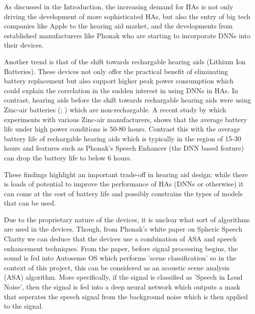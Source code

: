 \documentclass[logo,bsc,singlespacing,parskip,online]{infthesis}
\begin{document}

As discussed in the Introduction, the increasing demand for HAs is not only 
driving the development of more sophisticated HAs, but also the entry of big tech 
companies like Apple to the hearing aid market, and the developments from established 
manufacturers like Phonak who are starting to incorporate DNNs into their devices.

Another trend is that of the shift towards rechargable hearing aids (Lithium Ion Batteries).
These devices not only offer the practical benefit of eliminating battery replacement but also support higher peak power consumption 
which could explain the correlation in the sudden interest in using DNNs in HAs.
In contrast, hearing aids before the shift towards rechargable hearing aids were using Zinc-air batteries 
(\cite{sparkes_study_1997}; \cite{mir_evaluation_2023})
which are non-rechargable.
A recent study by \citet{thomas_zincair_2024} which 
experiments with various Zinc-air manufacturers, shows that the average battery life 
under high power conditions is 50-80 hours. Contrast this with the average battery life of 
rechargable hearing aids which is typically in the region of 15-30 hours and 
features such as Phonak's Speech Enhancer (the DNN based feature) can drop the battery life 
to below 6 hours. 

These findings highlight an important trade-off in hearing aid design: 
while there is loads of potential to improve the performance of HAs (DNNs or otherwise)
it can come at the cost of battery life and possibly constrains 
the types of models that can be used. 

Due to the proprietary nature of the devices, it is unclear what sort of 
algorithms are used in the devices. Though, from Phonak's white paper on Spheric Speech Clarity \cite{Hasemann2024PhonakSphere}
we can deduce that the devices use a combination of ASA and speech enhancement techniques.
From the paper, before signal processing begins, the sound is fed into Autosense OS which 
performs 'scene classification' so in the context of this project, this can be 
considered as an acoustic scene analysis (ASA) algorithm. More specifically, if 
the signal is classified as 'Speech in Loud Noise', then the signal is fed into a 
deep neural network which outputs a mask that seperates the speech signal from the background noise 
which is then applied to the signal. 
\end{document}
